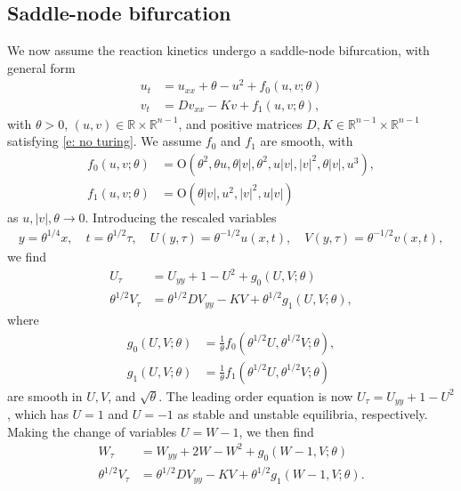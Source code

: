 \documentclass[11pt]{article}
\newcommand{\R}{\mathbb{R}}
\numberwithin{equation}{section}
\numberwithin{prop}{section}
\begin{document}
\subsection{Saddle-node bifurcation}
We now assume the reaction kinetics undergo a saddle-node bifurcation, with general form
\begin{align}
	u_t &= u_{xx} + \theta - u^2 + f_0(u, v; \theta) \label{e: saddle node 1} \\
	v_t &= D v_{xx} - K v + f_1 (u, v; \theta), \label{e: saddle node 2}
\end{align}
with $\theta > 0$, $(u, v) \in \R \times \R^{n-1}$, and positive matrices $D, K \in \R^{n-1} \times \R^{n-1}$ satisfying \eqref{e: no turing}. We assume $f_0$ and $f_1$ are smooth, with 
\begin{align}
	f_0(u, v;\theta) &= \mathrm{O}\left( \theta^2,  \theta u, \theta |v|, \theta^2, u |v|, |v|^2, \theta |v|, u^3 \right), \\
	f_1 (u, v; \theta) &= \mathrm{O}\left(\theta |v|, u^2, |v|^2, u |v|\right)
\end{align}
as $u, |v|, \theta \to 0$. 
Introducing the rescaled variables
\begin{align}
	y = \theta^{1/4} x, \quad t = \theta^{1/2} \tau, \quad U(y,\tau) = \theta^{-1/2} u(x,t), \quad V(y,\tau) = \theta^{-1/2} v(x,t),
\end{align}
we find
\begin{align}
	U_\tau &= U_{yy} + 1 - U^2 + g_0(U, V; \theta) \\
	\theta^{1/2} V_\tau &= \theta^{1/2} D V_{yy} - K V + \theta^{1/2} g_1(U, V; \theta), 
\end{align}
where
\begin{align}
g_0 (U, V; \theta) &= \frac{1}{\theta} f_0 (\theta^{1/2} U, \theta^{1/2} V; \theta), \\
g_1 (U, V; \theta) &= \frac{1}{\theta} f_1 (\theta^{1/2} U, \theta^{1/2} V; \theta)
\end{align}
are smooth in $U, V$, and $\sqrt{\theta}$. The leading order equation is now $U_\tau = U_{yy} + 1 - U^2$, which has $U = 1$ and $U = -1$ as stable and unstable equilibria, respectively. Making the change of variables $U = W - 1$, we then find
\begin{align}
W_\tau &= W_{yy} + 2 W - W^2 + g_0 (W-1, V; \theta) \label{e: saddle-node scaled 1}\\
	\theta^{1/2} V_\tau &= \theta^{1/2} D V_{yy} - K V + \theta^{1/2} g_1(W-1, V; \theta). \label{e: saddle-node scaled 2}
\end{align}
\end{document}
